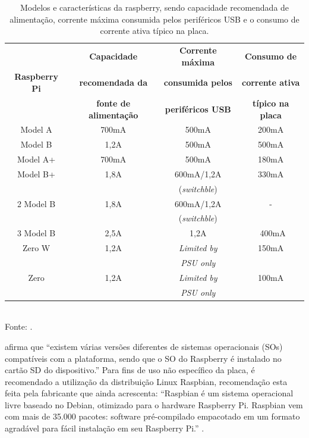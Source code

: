 \begin{table}[htb] \centering
	\caption{Modelos e características da raspberry, sendo capacidade recomendada de alimentação, corrente máxima consumida pelos periféricos USB e o consumo de corrente ativa típico na placa.} \label{tabela:consumo_raspberry}
	\begin{tabular}{c|ccc}        \hline
		& \textbf{Capacidade}  & \textbf{Corrente máxima} &   \textbf{Consumo de}    \\ 
		\textbf{Raspberry Pi} &   \textbf{recomendada da}    & \textbf{consumida pelos} & \textbf{corrente ativa}  \\
		& \textbf{fonte de alimentação} & \textbf{periféricos USB} & \textbf{típico na placa} \\ \hline \hline          
		Model A 	 &        700mA         &     500mA       &      200mA      \\ 
		Model B	 	 &	      1,2A          &      500mA      &      500mA      \\ 
		Model A+ 	 &        700mA         &      500mA      &      180mA      \\ 
		Model B+ 	 &        1,8A          &   600mA/1,2A    &      330mA      \\  
		&                      &(\textit{switchble}) &             \\ 
		2 Model B	 & 	      1,8A          &   600mA/1,2A    &        -        \\  
		&                      &(\textit{switchble}) &             \\ 
		3 Model B	 &  	  2,5A          &      1,2A       &      ~400mA     \\ 
		Zero W		 &   	  1,2A          &\textit{Limited by} &      150mA   \\ 
		&                      &\textit{PSU only} &                \\
		Zero		 &        1,2A          &\textit{Limited by}&      100mA    \\ 
		&                      &\textit{PSU only} &                \\ \hline
	\end{tabular}
	\\ Fonte: \cite{fundacaoraspberry:2017:raspberry}.
\end{table}

\citet[p.~20]{coutinho:2016:sistema} afirma  que “existem várias versões diferentes de sistemas operacionais (SOs) compatíveis com a plataforma, sendo que o SO do Raspberry é instalado no cartão SD do dispositivo.” Para fins de uso não específico da placa, é recomendado a utilização da distribuição Linux Raspbian, recomendação esta feita pela fabricante que ainda acrescenta: “Raspbian é um sistema operacional livre baseado no Debian, otimizado para o hardware Raspberry Pi. Raspbian vem com mais de 35.000 pacotes: software pré-compilado empacotado em um formato agradável para fácil instalação em seu Raspberry Pi.” \cite{fundacaoraspberry:2017:raspberry}.  

